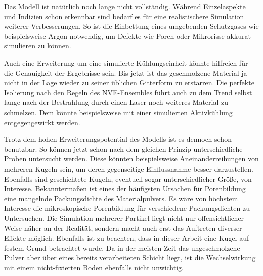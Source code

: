 Das Modell ist natürlich noch lange nicht vollständig. Während Einzelaspekte und Indizien schon
erkennbar sind bedarf es für eine realistischere Simulation weiterer Verbesserungen. So ist die
Einbettung eines umgebenden Schutzgases wie beispielsweise Argon notwendig, um Defekte wie Poren
oder Mikrorisse akkurat simulieren zu können.

Auch eine Erweiterung um eine simulierte Kühlungseinheit könnte hilfreich für die Genauigkeit
der Ergebnisse sein. Bis jetzt ist das geschmolzene Material ja nicht in der Lage wieder zu seiner
üblichen Gitterform zu erstarren. Die perfekte Isolierung nach den Regeln des NVE-Ensembles führt
auch zu dem Trend selbst lange nach der Bestrahlung durch einen Laser noch weiteres Material zu
schmelzen. Dem könnte beispielsweise mit einer simulierten Aktivkühlung entgegengewirkt werden.

Trotz dem hohen Erweiterungspotential des Modells ist es dennoch schon benutzbar. So können jetzt
schon nach dem gleichen Prinzip unterschiedliche Proben untersucht werden. Diese könnten
beispielsweise Aneinanderreihungen von mehreren Kugeln sein, um deren gegenseitige Einflussnahme
besser darzustellen. Ebenfalls sind geschichtete Kugeln, eventuell sogar unterschiedlicher Größe,
von Interesse. Bekanntermaßen ist eines der häufigsten Ursachen für Porenbildung eine mangelnde
Packungsdichte des Materialpulvers. Es wäre von höchstem Interesse die mikroskopische Porenbildung
für verschiedene Packungsdichten zu Untersuchen. Die Simulation mehrerer Partikel liegt nicht nur
offensichtlicher Weise näher an der Realität, sondern macht auch erst das Auftreten diverser
Effekte möglich. Ebenfalls ist zu beachten, dass in dieser Arbeit eine Kugel auf festem Grund
betrachtet wurde. Da in der meisten Zeit das ungeschmolzene Pulver aber über eines bereits
verarbeiteten Schicht liegt, ist die Wechselwirkung mit einem nicht-fixierten Boden ebenfalls
nicht unwichtig.
